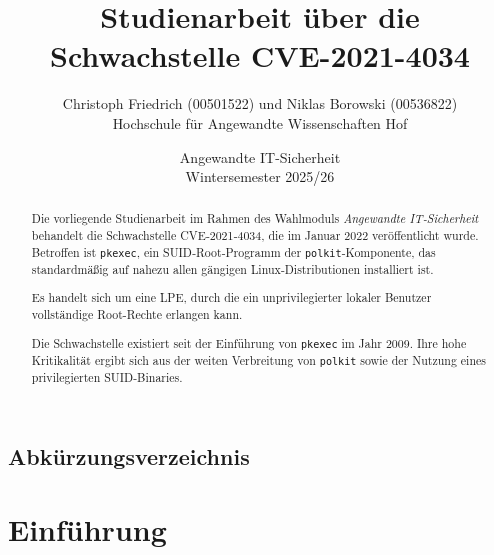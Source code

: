 \documentclass[oneside,11pt,a4paper,article,german]{memoir}
\author{Christoph Friedrich (00501522) und Niklas Borowski (00536822) \\Hochschule für Angewandte Wissenschaften Hof}
\date{Angewandte IT-Sicherheit \\ Wintersemester 2025/26}
\title{\textbf{Studienarbeit über die Schwachstelle CVE-2021-4034}}
\begin{document}
\maketitle
\thispagestyle{empty}
\begin{abstract}
    \sloppy
    \hspace*{1.5em}Die vorliegende Studienarbeit im Rahmen des Wahlmoduls \textit{Angewandte IT‑Sicherheit} behandelt die Schwachstelle CVE‑2021‑4034, die im Januar 2022 veröffentlicht wurde. Betroffen ist \texttt{pkexec}, ein SUID‑Root‑Programm der \texttt{polkit}‑Komponente, das standardmäßig auf nahezu allen gängigen Linux‑Distributionen installiert ist.
    \par Es handelt sich um eine LPE, durch die ein unprivilegierter lokaler Benutzer vollständige Root-Rechte erlangen kann.
    \par Die Schwachstelle existiert seit der Einführung von \texttt{pkexec} im Jahr 2009. Ihre hohe Kritikalität ergibt sich aus der weiten Verbreitung von \texttt{polkit} sowie der Nutzung eines privilegierten SUID‑Binaries.
    \fussy

\end{abstract}

\newpage
\renewcommand*{\contentsname}{Inhaltsverzeichnis}
\begin{KeepFromToc}
    \tableofcontents
\end{KeepFromToc}
\thispagestyle{empty}
\newpage


\listoffigures
\thispagestyle{empty}
\thispagestyle{empty}
\lstlistoflistings
\thispagestyle{empty}

\section*{Abkürzungsverzeichnis}
\thispagestyle{empty}
\begin{acronym}[PKEXEC]
\end{acronym}
\newpage


\chapter{Einführung}
\end{document}
